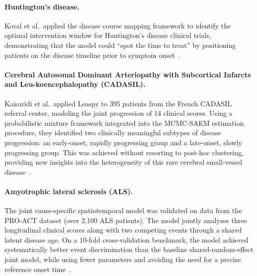 \documentclass{rapportCS}
\begin{document}
\paragraph{Huntington's disease.} Koval et al.\ applied the disease course mapping framework to identify the optimal intervention window for Huntington's disease clinical trials, demonstrating that the model could ``spot the time to treat'' by positioning patients on the disease timeline prior to symptom onset~\cite{koval2022forecasting}.

\paragraph{Cerebral Autosomal Dominant Arteriopathy with Subcortical Infarcts and Leu-koencephalopathy (CADASIL).}
Kaisaridi et al.\ applied Leaspy to 395 patients from the French CADASIL referral center, modeling the joint progression of 14 clinical scores. Using a probabilistic mixture framework integrated into the MCMC-SAEM estimation procedure, they identified two clinically meaningful subtypes of disease progression: an early-onset, rapidly progressing group and a late-onset, slowly progressing group. This was achieved without resorting to post-hoc clustering, providing new insights into the heterogeneity of this rare cerebral small-vessel disease~\cite{kaisaridi2025mixture}.


\paragraph{Amyotrophic lateral sclerosis (ALS).}
The joint cause-specific spatiotemporal model was validated on data from the PRO-ACT dataset (over 2,100 ALS patients). The model jointly analyzes three longitudinal clinical scores along with two competing events through a shared latent disease age. On a 10-fold cross-validation benchmark, the model achieved systematically better event discrimination than the baseline shared-random-effect joint model, while using fewer parameters and avoiding the need for a precise reference onset time~\cite{ortholand2026joint}.

\end{document}
